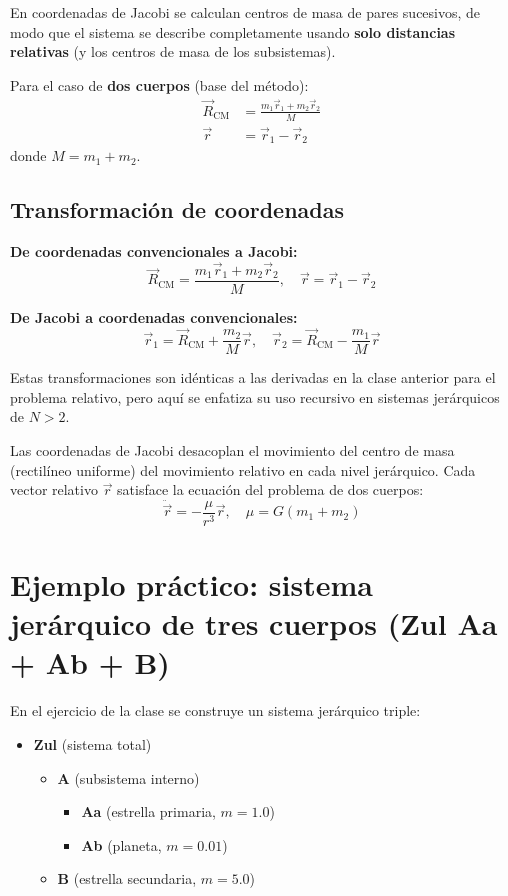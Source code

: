 En coordenadas de Jacobi se calculan centros de masa de pares sucesivos, de modo que el sistema se describe completamente usando \textbf{solo distancias relativas} (y los centros de masa de los subsistemas).

Para el caso de \textbf{dos cuerpos} (base del método):
\begin{align*}
\vec{R}_{\text{CM}} &= \frac{m_1 \vec{r}_1 + m_2 \vec{r}_2}{M} \\
\vec{r} &= \vec{r}_1 - \vec{r}_2
\end{align*}
donde \(M = m_1 + m_2\).

\subsection{Transformación de coordenadas}
\textbf{De coordenadas convencionales a Jacobi:}
\[
\vec{R}_{\text{CM}} = \frac{m_1 \vec{r}_1 + m_2 \vec{r}_2}{M}, \quad
\vec{r} = \vec{r}_1 - \vec{r}_2
\]

\textbf{De Jacobi a coordenadas convencionales:}
\[
\vec{r}_1 = \vec{R}_{\text{CM}} + \frac{m_2}{M} \vec{r}, \quad
\vec{r}_2 = \vec{R}_{\text{CM}} - \frac{m_1}{M} \vec{r}
\]

Estas transformaciones son idénticas a las derivadas en la clase anterior para el problema relativo, pero aquí se enfatiza su uso recursivo en sistemas jerárquicos de \(N > 2\).

\begin{importante}
Las coordenadas de Jacobi desacoplan el movimiento del centro de masa (rectilíneo uniforme) del movimiento relativo en cada nivel jerárquico. Cada vector relativo \(\vec{r}\) satisface la ecuación del problema de dos cuerpos:
\[
\ddot{\vec{r}} = -\frac{\mu}{r^3}\vec{r}, \quad \mu = G(m_1 + m_2)
\]
\end{importante}

\section{Ejemplo práctico: sistema jerárquico de tres cuerpos (Zul Aa + Ab + B)}
En el ejercicio de la clase se construye un sistema jerárquico triple:

\begin{itemize}[leftmargin=2em,label={}]
\item \textbf{Zul} (sistema total)
  \begin{itemize}[leftmargin=2em,label={}]
  \item \textbf{A} (subsistema interno)
    \begin{itemize}[leftmargin=2em,label={}]
    \item \textbf{Aa} (estrella primaria, \(m = 1.0\))
    \item \textbf{Ab} (planeta, \(m = 0.01\))
    \end{itemize}
  \item \textbf{B} (estrella secundaria, \(m = 5.0\))
  \end{itemize}
\end{itemize}

